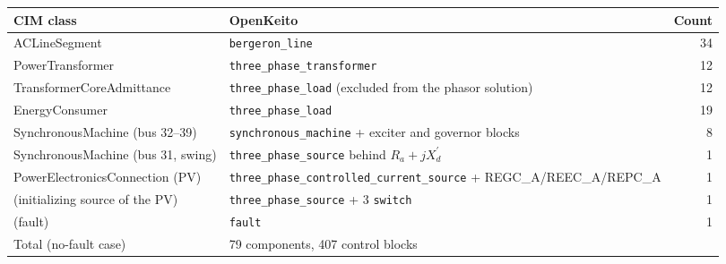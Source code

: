\begin{tabular}{llr}
\toprule
CIM class & OpenKeito & Count \\
\midrule
ACLineSegment & \texttt{bergeron\_line} & 34 \\
PowerTransformer & \texttt{three\_phase\_transformer} & 12 \\
TransformerCoreAdmittance & \texttt{three\_phase\_load} (excluded from the phasor solution) & 12 \\
EnergyConsumer & \texttt{three\_phase\_load} & 19 \\
SynchronousMachine (bus 32--39) & \texttt{synchronous\_machine} + exciter and governor blocks & 8 \\
SynchronousMachine (bus 31, swing) & \texttt{three\_phase\_source} behind $R_a + jX_d^\prime$ & 1 \\
PowerElectronicsConnection (PV) & \texttt{three\_phase\_controlled\_current\_source} + REGC\_A/REEC\_A/REPC\_A & 1 \\
(initializing source of the PV) & \texttt{three\_phase\_source} + 3 \texttt{switch} & 1 \\
(fault) & \texttt{fault} & 1 \\
Total (no-fault case) & 79 components, 407 control blocks &  \\
\bottomrule
\end{tabular}

